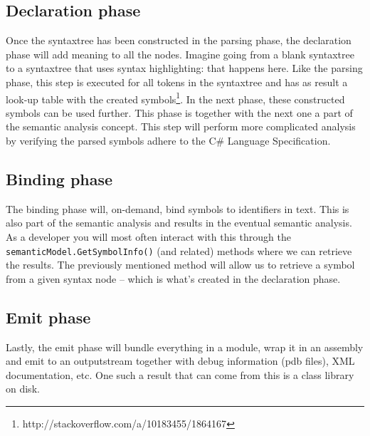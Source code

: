 \subsection{Declaration phase}
\label{sec:declaration-phase}

Once the \gls{syntaxtree} has been constructed in the parsing phase, the declaration phase will add meaning to all the nodes. Imagine going from a blank \gls{syntaxtree} to a \gls{syntaxtree} that uses syntax highlighting: that happens here. Like the parsing phase, this step is executed for all tokens in the \gls{syntaxtree} and has as result a look-up table with the created symbols\footnote{http://stackoverflow.com/a/10183455/1864167}. In the next phase, these constructed symbols can be used further. This phase is together with the next one a part of the semantic analysis concept. This step will perform more complicated analysis by verifying the parsed symbols adhere to the C\# Language Specification.

\subsection{Binding phase}
\label{sec:binding-phase}

The binding phase will, on-demand, bind symbols to identifiers in text. This is also part of the semantic analysis and results in the eventual semantic analysis. As a developer you will most often interact with this through the \texttt{semanticModel.GetSymbolInfo()} (and related) methods where we can retrieve the results. The previously mentioned method will allow us to retrieve a symbol from a given syntax node -- which is what's created in the declaration phase.

\subsection{Emit phase}
\label{sec:emit-phase}

Lastly, the emit phase will bundle everything in a module, wrap it in an assembly and emit to an outputstream together with debug information (\gls{pdb} files), XML documentation, etc. One such a result that can come from this is a class library on disk.